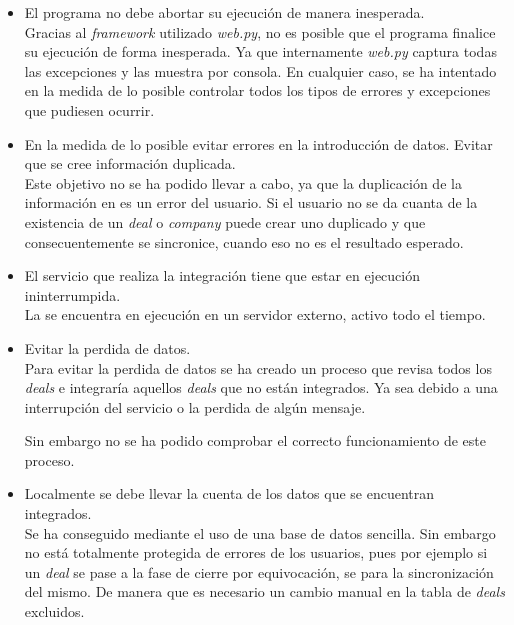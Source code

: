 \begin{itemize}
	\item El programa no debe abortar su ejecución de manera inesperada.\\
	
	Gracias al \textit{framework} utilizado \textit{web.py}, no es posible que el programa finalice su ejecución de forma inesperada. 
	Ya que internamente \textit{web.py} captura todas las excepciones y las muestra por consola. En cualquier caso, se ha intentado en la medida de lo posible controlar todos los tipos de errores y excepciones que pudiesen ocurrir.
	
	\item En la medida de lo posible evitar errores en la introducción de datos. Evitar que se cree información duplicada.\\
	
	Este objetivo no se ha podido llevar a cabo, ya que la duplicación de la información en \hs{} es un error del usuario. Si el usuario no se da cuanta de la existencia de un \textit{deal} o \textit{company} puede crear uno duplicado y que consecuentemente se sincronice, cuando eso no es el resultado esperado.
	
	
	\item El servicio que realiza la integración tiene que estar en ejecución ininterrumpida.\\
	
	La \iface{} se encuentra en ejecución en un servidor externo, activo todo el tiempo.
	
	\item Evitar la perdida de datos.\\
	
	Para evitar la perdida de datos se ha creado un proceso que revisa todos los \textit{deals} e integraría aquellos \textit{deals} que no están integrados. 
	Ya sea debido a una interrupción del servicio o la perdida de algún mensaje.
	
	Sin embargo no se ha podido comprobar el correcto funcionamiento de este proceso.
	\item Localmente se debe llevar la cuenta de los datos que se encuentran integrados.\\
	
	Se ha conseguido mediante el uso de una base de datos sencilla.
	Sin embargo no está totalmente protegida de errores  de los usuarios, pues por ejemplo si un \textit{deal} se pase a la fase de cierre por equivocación, se para la sincronización del mismo.
	De manera que es necesario un cambio manual en la tabla de \textit{deals} excluidos.
	

\end{itemize}
